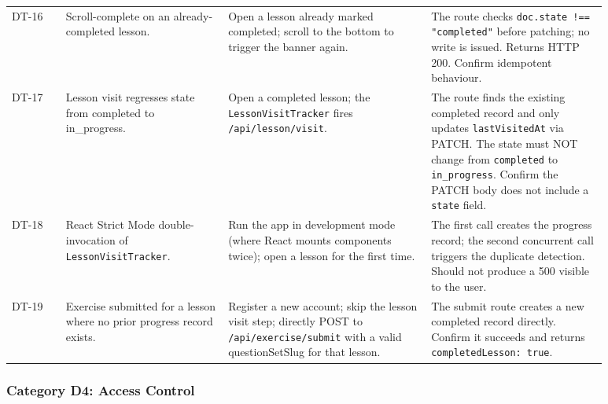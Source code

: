 \begin{longtable}{p{0.08\linewidth} p{0.24\linewidth} p{0.30\linewidth} p{0.26\linewidth}}
DT-16 & Scroll-complete on an already-completed lesson. & Open a lesson already marked completed; scroll to the bottom to trigger the banner again. & The route checks \texttt{doc.state !== "completed"} before patching; no write is issued. Returns HTTP 200. Confirm idempotent behaviour. \\
DT-17 & Lesson visit regresses state from completed to in\_progress. & Open a completed lesson; the \texttt{LessonVisitTracker} fires \texttt{/api/lesson/visit}. & The route finds the existing completed record and only updates \texttt{lastVisitedAt} via PATCH. The state must NOT change from \texttt{completed} to \texttt{in\_progress}. Confirm the PATCH body does not include a \texttt{state} field. \\
DT-18 & React Strict Mode double-invocation of \texttt{LessonVisitTracker}. & Run the app in development mode (where React mounts components twice); open a lesson for the first time. & The first call creates the progress record; the second concurrent call triggers the duplicate detection. Should not produce a 500 visible to the user. \\
DT-19 & Exercise submitted for a lesson where no prior progress record exists. & Register a new account; skip the lesson visit step; directly POST to \texttt{/api/exercise/submit} with a valid questionSetSlug for that lesson. & The submit route creates a new completed record directly. Confirm it succeeds and returns \texttt{completedLesson: true}. \\
\bottomrule
\end{longtable}

\subsubsection{Category D4: Access Control}

